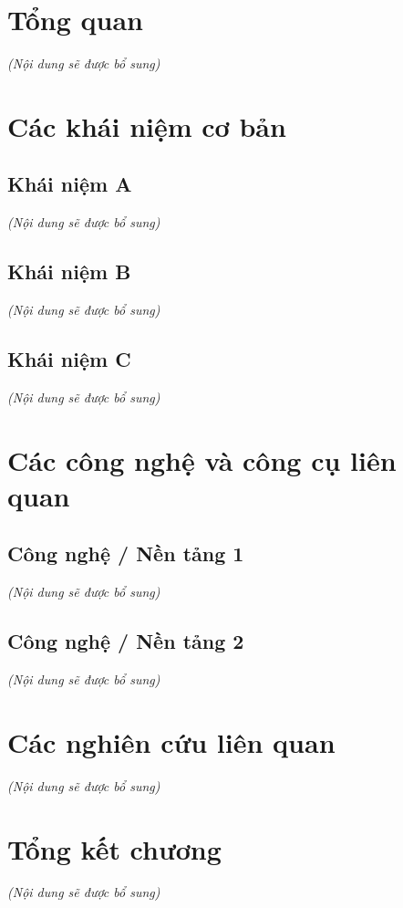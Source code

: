 \section{Tổng quan}
\textit{(Nội dung sẽ được bổ sung)}

\section{Các khái niệm cơ bản}
\subsection{Khái niệm A}
\textit{(Nội dung sẽ được bổ sung)}

\subsection{Khái niệm B}
\textit{(Nội dung sẽ được bổ sung)}

\subsection{Khái niệm C}
\textit{(Nội dung sẽ được bổ sung)}

\section{Các công nghệ và công cụ liên quan}
\subsection{Công nghệ / Nền tảng 1}
\textit{(Nội dung sẽ được bổ sung)}

\subsection{Công nghệ / Nền tảng 2}
\textit{(Nội dung sẽ được bổ sung)}

\section{Các nghiên cứu liên quan}
\textit{(Nội dung sẽ được bổ sung)}

\section{Tổng kết chương}
\textit{(Nội dung sẽ được bổ sung)}
